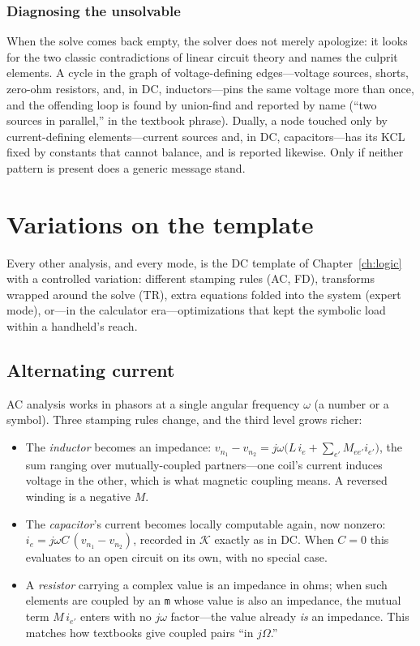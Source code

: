 \documentclass[11pt,oneside]{report}
\newcommand{\code}[1]{\texttt{#1}}
\begin{document}
\subsection{Diagnosing the unsolvable}
\label{sec:diagnose}

When the solve comes back empty, the solver does not merely
apologize: it looks for the two classic contradictions of linear
circuit theory and names the culprit elements. A cycle in the graph of
voltage-defining edges---voltage sources, shorts, zero-ohm resistors,
and, in DC, inductors---pins the same voltage more than once, and the
offending loop is found by union-find and reported by name (``two
sources in parallel,'' in the textbook phrase). Dually, a node touched
only by current-defining elements---current sources and, in DC,
capacitors---has its KCL fixed by constants that cannot balance, and
is reported likewise. Only if neither pattern is present does a
generic message stand.

\chapter{Variations on the template}
\label{ch:variations}

Every other analysis, and every mode, is the DC template of
Chapter~\ref{ch:logic} with a controlled variation: different stamping
rules (AC, FD), transforms wrapped around the solve (TR), extra
equations folded into the system (expert mode), or---in the
calculator era---optimizations that kept the symbolic load within a
handheld's reach.

\section{Alternating current}
\label{sec:ac}

AC analysis works in phasors at a single angular frequency $\omega$ (a
number or a symbol). Three stamping rules change, and the third
level grows richer:

\begin{itemize}
\item The \emph{inductor} becomes an impedance:
  $v_{n_1} - v_{n_2} = j\omega\bigl(L\,i_e + \sum_{e'} M_{ee'}
  i_{e'}\bigr)$, the sum ranging over mutually-coupled partners---one
  coil's current induces voltage in the other, which is what magnetic
  coupling means. A reversed winding is a negative $M$.
\item The \emph{capacitor}'s current becomes locally computable again,
  now nonzero: $i_e = j\omega C\,(v_{n_1} - v_{n_2})$, recorded in
  $\mathcal{K}$ exactly as in DC. When $C=0$ this evaluates to an
  open circuit on its own, with no special case.
\item A \emph{resistor} carrying a complex value is an impedance in
  ohms; when such elements are coupled by an \code{m} whose value is
  also an impedance, the mutual term $M\,i_{e'}$ enters with no
  $j\omega$ factor---the value already \emph{is} an impedance. This
  matches how textbooks give coupled pairs ``in $j\Omega$.''
\end{itemize}
\end{document}
